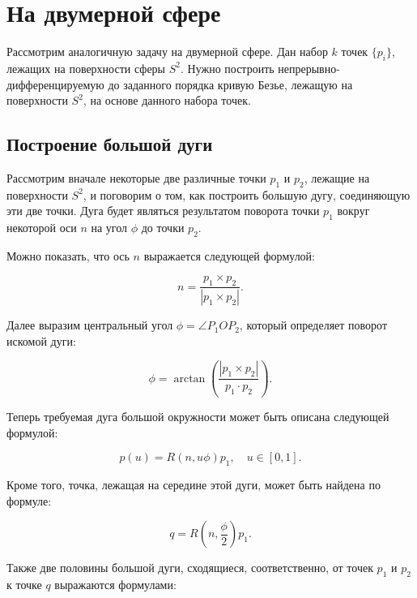 \section{На двумерной сфере}

Рассмотрим аналогичную задачу на двумерной сфере. Дан набор $k$ точек $\{p_i\}$, лежащих на поверхности сферы $S^2$.
Нужно построить непрерывно-дифференци\-руемую до заданного порядка кривую Безье, лежащую на поверхности $S^2$, на
основе данного набора точек.

\subsection*{Построение большой дуги}

Рассмотрим вначале некоторые две различные точки $p_1$ и $p_2$, лежащие на поверхности $S^2$, и поговорим о том, как
построить большую дугу, соединяющую эти две точки. Дуга будет являться результатом поворота точки $p_1$ вокруг
некоторой оси $n$ на угол $\phi$ до точки $p_2$.

Можно показать, что ось $n$ выражается следующей формулой:

\begin{equation}
n=\frac{p_1\times p_2}{|p_1\times p_2|}.
\label{two-dimension-sphere-bezier-axis}
\end{equation}

Далее выразим центральный угол $\phi=\angle P_1OP_2$, который определяет поворот искомой дуги:

\begin{equation}
\phi=\arctan\left(\frac{|p_1\times p_2|}{p_1\cdot p_2}\right).
\label{two-dimension-sphere-bezier-angle}
\end{equation}

Теперь требуемая дуга большой окружности может быть описана следующей формулой:

\begin{equation}
p(u)=R(n,u\phi)p_1, \quad u \in [0,1].
\label{two-dimension-big-arc}
\end{equation}

Кроме того, точка, лежащая на середине этой дуги, может быть найдена по формуле:

\begin{equation}
q=R(n,\frac{\phi}{2})p_1.
\label{two-dimension-big-arc-mid}
\end{equation}

Также две половины большой дуги, сходящиеся, соответственно, от точек $p_1$ и $p_2$ к точке $q$ выражаются формулами:

